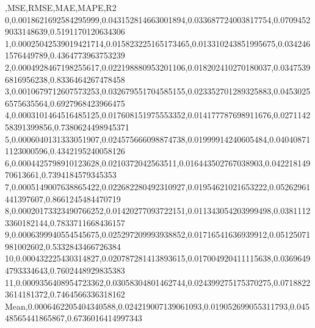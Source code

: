 ,MSE,RMSE,MAE,MAPE,R2
0,0.0018621692584295999,0.043152814663001894,0.033687724003817754,0.07094529033148639,0.5191170120634306
1,0.00025042539019421714,0.015823225165173465,0.013310243851995675,0.0342461576449789,0.4364773963753239
2,0.0004928467198255617,0.022198880953201106,0.018202410270180037,0.03475396816956238,0.8336464267478458
3,0.0010679712607573253,0.032679551704585155,0.023352701289325883,0.04530256575635564,0.6927968423966475
4,0.0003101464516485125,0.017608151975553352,0.014177787698911676,0.027114258391399856,0.7380624498945371
5,0.0006040131333051907,0.024575666098874738,0.01999914240605484,0.040408711123000596,0.4342195240058126
6,0.0004425798910123628,0.0210372042563511,0.016443502767038903,0.04221814970613661,0.7394184579345353
7,0.0005149007638865422,0.022682280492310927,0.01954621021653222,0.05262961441397607,0.8661245484470719
8,0.00020173323490766252,0.01420277093722151,0.011343054203999498,0.03811123360182144,0.7833711668436157
9,0.0006399940554545675,0.025297209993938852,0.01716541636939912,0.05125071981002602,0.5332843466726384
10,0.000432225430314827,0.020787281413893615,0.017004920411115638,0.03696494793334643,0.7602448929835383
11,0.0009356408954723362,0.03058304801462744,0.024399275175370275,0.07188223614181372,0.7464566336318162
Mean,0.0006462205404340588,0.024219007139061093,0.019052699055311793,0.04548565441865867,0.6736016414997343
